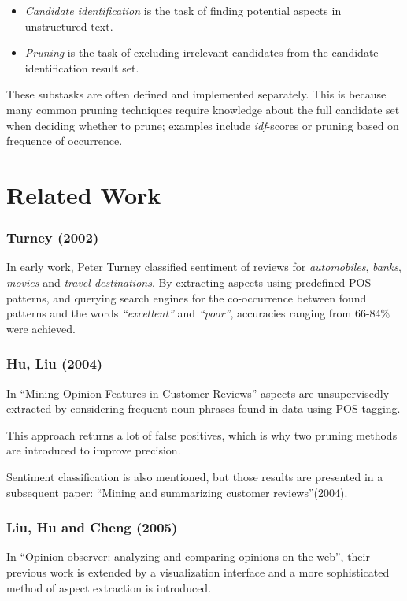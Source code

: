 \documentclass[a4paper,11pt]{kth-mag}
\begin{document}
\begin{itemize}
\item \emph{Candidate identification} is the task of finding potential aspects in unstructured text.

\item \emph{Pruning} is the task of excluding irrelevant candidates from the candidate
identification result set.

\end{itemize}

These substasks are often defined and implemented separately. This is because many common pruning
techniques require knowledge about the full candidate set when deciding whether to prune; examples include \emph{idf}-scores or pruning based on frequence of occurrence.


\section{Related Work}

\subsubsection{Turney (2002)}
In early work, Peter Turney classified sentiment of reviews for \emph{automobiles}, \emph{banks}, \emph{movies} and \emph{travel destinations}. By extracting aspects using predefined POS-patterns, and querying search engines for the co-occurrence between found patterns and the words \emph{``excellent''} and \emph{``poor''}, accuracies ranging from 66-84\% were achieved.

\subsubsection{Hu, Liu (2004)}
In ``Mining Opinion Features in Customer Reviews'' aspects are unsupervisedly
extracted by considering frequent noun phrases found in data using POS-tagging.

This approach returns a lot of false positives, which is why two pruning
methods are introduced to improve precision.

Sentiment classification is also mentioned, but those results are presented in a subsequent paper:
``Mining and summarizing customer reviews''(2004).


\subsubsection{Liu, Hu and Cheng (2005)}
In ``Opinion observer: analyzing and comparing opinions on the web'', their previous work is extended
by a visualization interface and a more sophisticated method of aspect extraction is introduced.
\end{document}
